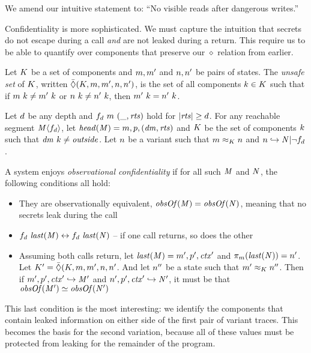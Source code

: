 \documentclass[acmsmall,review,anonymous]{acmart}\settopmatter{printfolios=true,printccs=false,printacmref=false}
\begin{document}
We amend our intuitive statement to: ``No visible reads after dangerous writes.''

Confidentiality is more sophisticated. We must capture the intuition that
secrets do not escape during a call {\em and} are not leaked during a return.
This require us to be able to quantify over components that preserve our \(\diamond\)
relation from earlier.

 Let \(K\) be a set of components and \(m,m'\) and \(n,n'\)
be pairs of states. The {\em unsafe set} of \(K\), written
\(\bar{\Diamond}(K,m,m',n,n')\), is the set of all components
\(k \in K\) such that if
\(m ~ k \not = m' ~ k\) or
\(n ~ k \not = n' ~ k\), then
\(m' ~ k = n' ~ k\).

 Let \(d\) be any depth and \(f_d ~ m ~ (\_, \mathit{rts})\) hold for
\(|\mathit{rts}| \geq d\). For any reachable segment \(\mathit{M} \langle f_d \rangle\),
let \(\mathit{head}(\mathit{M}) = m,p,(\mathit{dm},\mathit{rts})\) and
\(K\) be the set of components \(k\) such that \(\mathit{dm} ~ k \not = \mathit{outside}\).
Let \(n\) be a variant such that \(m \approx_K n\) and
\(n \hookrightarrow \mathit{N} | \neg f_d \).

A system enjoys {\em observational confidentiality} if for all such
\(\mathit{M}\) and \(\mathit{N}\), the following conditions all hold:

\begin{itemize}
\item They are observationally equivalent, \(\mathit{obsOf}(\mathit{M}) = \mathit{obsOf}(\mathit{N})\),
  meaning that no secrets leak during the call
\item \(f_d ~ \mathit{last}(\mathit{M}) \leftrightarrow f_d ~ \mathit{last}(\mathit{N})\) --
  if one call returns, so does the other
\item Assuming both calls return, let \(\mathit{last}(\mathit{M}) = m',p',\mathit{ctx}'\)
  and \(\pi_m(\mathit{last}(\mathit{N})) = n'\).
  Let \(K' = \bar{\Diamond}(K,m,m',n,n'\).
  And let \(n''\) be a state such that \(m' \approx_K n''\).
  Then if \(m',p',\mathit{ctx}' \hookrightarrow \mathit{M}'\) and
  \(n',p',\mathit{ctx}' \hookrightarrow \mathit{N}'\), it must be
  that \(\mathit{obsOf}(\mathit{M}') \simeq \mathit{obsOf}(\mathit{N}')\)
\end{itemize}

This last condition is the most interesting: we identify the components that
contain leaked information on either side of the first pair of variant traces.
This becomes the basis for the second variation, because all of these values
must be protected from leaking for the remainder of the program.
\end{document}
